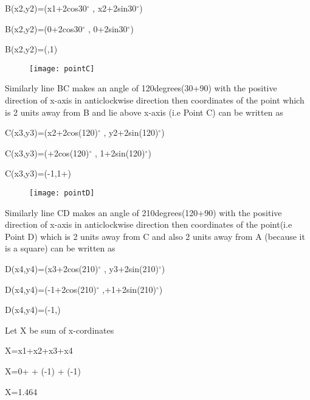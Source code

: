 \documentclass[12]{article}
\begin{document}
B(x2,y2)=(x1+2cos30$^\circ$ , x2+2sin30$^\circ$)

B(x2,y2)=(0+2cos30$^\circ$ , 0+2sin30$^\circ$)

B(x2,y2)=(,1)

\begin{figure}[h]
\centering
\texttt{[image: pointC]}
\end{figure}

Similarly line BC makes an angle of 120degrees(30+90) with the positive direction of x-axis in anticlockwise direction
then coordinates of the point which is 2 units away from B and lie above x-axis (i.e Point C) can be written as

C(x3,y3)=(x2+2cos(120)$^\circ$ , y2+2sin(120)$^\circ$)

C(x3,y3)=(+2cos(120)$^\circ$ , 1+2sin(120)$^\circ$)

C(x3,y3)=(-1,1+)

\begin{figure}[h]
\centering
\texttt{[image: pointD]}
\end{figure}

Similarly line CD makes an angle of 210degrees(120+90) with the positive direction of x-axis in anticlockwise direction
then coordinates of the point(i.e Point D) which is 2 units away from C and also 2 units away from A (because it is a square) can be written as

D(x4,y4)=(x3+2cos(210)$^\circ$ , y3+2sin(210)$^\circ$)

D(x4,y4)=(-1+2cos(210)$^\circ$ ,+1+2sin(210)$^\circ$)

D(x4,y4)=(-1,)

Let X be sum of x-cordinates

X=x1+x2+x3+x4

X=0+ + (-1) + (-1)

X=1.464
\end{document}
